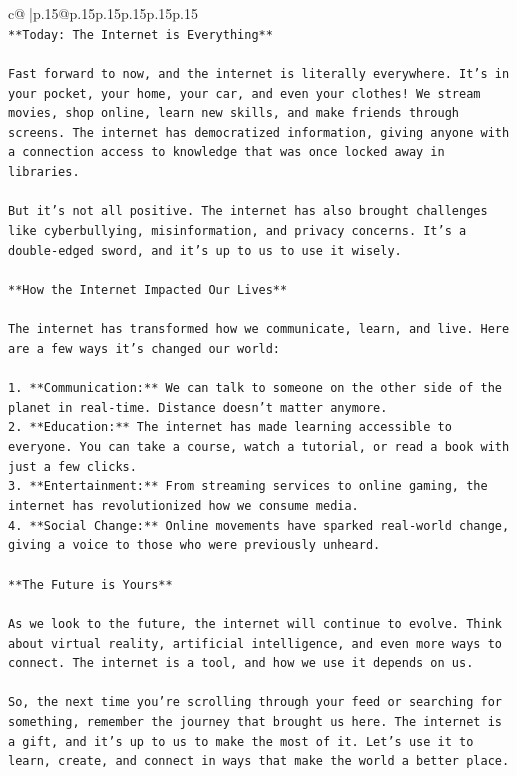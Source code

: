 \documentclass{article}
\begin{document}
{\begin{supertabular}{c@{$\;$}|p{.15\linewidth}@{}p{.15\linewidth}p{.15\linewidth}p{.15\linewidth}p{.15\linewidth}p{.15\linewidth}}
{{{\\ 
\texttt{**Today: The Internet is Everything**} \\
\\ 
\texttt{Fast forward to now, and the internet is literally everywhere. It's in your pocket, your home, your car, and even your clothes! We stream movies, shop online, learn new skills, and make friends through screens. The internet has democratized information, giving anyone with a connection access to knowledge that was once locked away in libraries.} \\
\\ 
\texttt{But it's not all positive. The internet has also brought challenges like cyberbullying, misinformation, and privacy concerns. It's a double{-}edged sword, and it's up to us to use it wisely.} \\
\\ 
\texttt{**How the Internet Impacted Our Lives**} \\
\\ 
\texttt{The internet has transformed how we communicate, learn, and live. Here are a few ways it's changed our world:} \\
\\ 
\texttt{1.  **Communication:** We can talk to someone on the other side of the planet in real{-}time. Distance doesn't matter anymore.} \\
\texttt{2.  **Education:** The internet has made learning accessible to everyone. You can take a course, watch a tutorial, or read a book with just a few clicks.} \\
\texttt{3.  **Entertainment:** From streaming services to online gaming, the internet has revolutionized how we consume media.} \\
\texttt{4.  **Social Change:** Online movements have sparked real{-}world change, giving a voice to those who were previously unheard.} \\
\\ 
\texttt{**The Future is Yours**} \\
\\ 
\texttt{As we look to the future, the internet will continue to evolve. Think about virtual reality, artificial intelligence, and even more ways to connect. The internet is a tool, and how we use it depends on us.} \\
\\ 
\texttt{So, the next time you're scrolling through your feed or searching for something, remember the journey that brought us here. The internet is a gift, and it's up to us to make the most of it. Let's use it to learn, create, and connect in ways that make the world a better place.} \\
}}}
\end{supertabular}}
\end{document}
